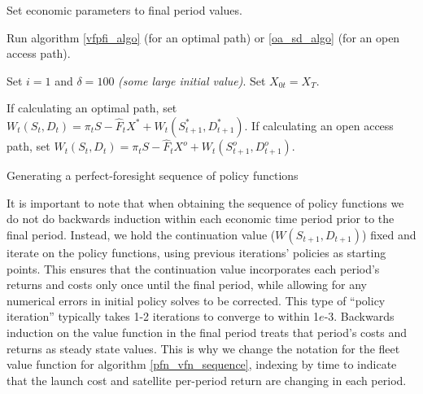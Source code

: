 \documentclass[9pt,twoside,lineno]{pnas-new}
\begin{document}
\begin{algorithm}
	Set economic parameters to final period values.
	
	Run algorithm \ref{vfpfi_algo} (for an optimal path) or \ref{oa_sd_algo} (for an open access path).
	
	 {
		Set $i=1$ and $\delta = 100$ \textit{(some large initial value)}. Set $X_{0t} = X_T$.
		
		If calculating an optimal path, set $W_t(S_t,D_t) = \pi_t S - \hat{F}_t X^* + W_t(S^*_{t+1},D^*_{t+1})$. If calculating an open access path, set $W_t(S_t,D_t) = \pi_t S - \hat{F}_t X^o + W_t(S^o_{t+1},D^o_{t+1})$.
	}
	\caption{Generating a perfect-foresight sequence of policy functions}\label{pfn_vfn_sequence}
\end{algorithm}

It is important to note that when obtaining the sequence of policy functions we do not do backwards induction within each economic time period prior to the final period. Instead, we hold the continuation value ($W(S_{t+1},D_{t+1})$) fixed and iterate on the policy functions, using previous iterations' policies as starting points. This ensures that the continuation value incorporates each period's returns and costs only once until the final period, while allowing for any numerical errors in initial policy solves to be corrected. This type of ``policy iteration'' typically takes 1-2 iterations to converge to within 1$e$-3. Backwards induction on the value function in the final period treats that period's costs and returns as steady state values. This is why we change the notation for the fleet value function for algorithm \ref{pfn_vfn_sequence}, indexing by time to indicate that the launch cost and satellite per-period return are changing in each period. \\
\end{document}
